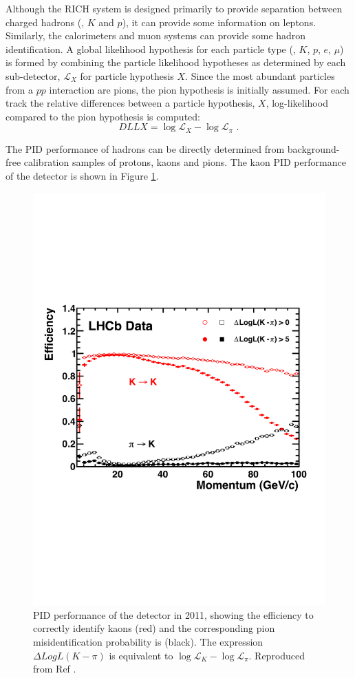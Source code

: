 Although the RICH system is designed primarily to provide separation between charged hadrons (\pion, $K$ and $p$), it can provide some information on leptons. Similarly, the calorimeters and muon systems can provide some hadron identification. A global likelihood hypothesis for each particle type (\pion, $K$, $p$, $e$, $\mu$) is formed by combining the particle likelihood hypotheses as determined by each sub-detector, $\mathcal{L}_X$ for particle hypothesis $X$. Since the most abundant particles from a $pp$ interaction are pions, the pion hypothesis is initially assumed. For each track the relative differences between a particle hypothesis, $X$, log-likelihood compared to the pion hypothesis is computed:
\begin{equation}
DLLX = \log{\mathcal{L}_X} - \log{\mathcal{L}_{\pi}} \text{ .}
\end{equation}

The PID performance of hadrons can be directly determined from background-free calibration samples of protons, kaons and pions. The kaon PID performance of the \lhcb detector is shown in Figure \ref{richperformance}.

\begin{figure}
\centering
\includegraphics[width=0.5\linewidth]{figures/detector/richperformance-data.pdf}
\caption{PID performance of the \rich detector in 2011, showing the efficiency to correctly identify kaons (red) and the corresponding pion misidentification probability is (black). The expression $\Delta LogL(K - \pi)$ is equivalent to $\log{\mathcal{L}_K} - \log{\mathcal{L}_{\pi}}$. Reproduced from Ref \cite{LHCb-DP-2012-003}.}
\label{richperformance}
\end{figure}

